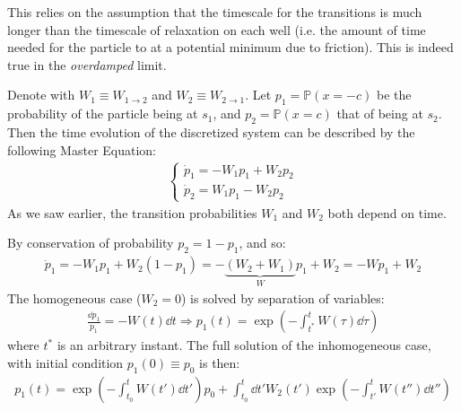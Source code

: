 \documentclass[../template.tex]{subfiles}
\begin{document}
\begin{expl}
    This relies on the assumption that the timescale for the transitions is much longer than the timescale of relaxation on each well (i.e. the amount of time needed for the particle to  at a potential minimum due to friction). This is indeed true in the \textit{overdamped} limit. 
\end{expl}

Denote with $W_1 \equiv W_{1 \to 2}$ and $W_2 \equiv W_{2 \to 1}$. Let $p_1 = \mathbb{P}(x=-c)$ be the probability of the particle being at $s_1$, and $p_2 = \mathbb{P}(x=c)$ that of being at $s_2$. Then the time evolution of the discretized system can be described by the following Master Equation:
\begin{align*}
    \begin{cases}
        \dot{p}_1 = -W_1p_1 + W_2 p_2\\
        \dot{p}_2 = W_1 p_1 - W_2 p_2
    \end{cases}
\end{align*}
As we saw earlier, the transition probabilities $W_1$ and $W_2$ both depend on time.

By conservation of probability $p_2 = 1-p_1$, and so:
\begin{align} \label{eqn:p1diff}
    \dot{p}_1 = - W_1 p_1 + W_2(1-p_1) = -\underbrace{(W_2+W_1)}_{W} p_1 + W_2 = - W p_1 + W_2
\end{align}
The homogeneous case ($W_2=0$) is solved by separation of variables:
\begin{align*}
    \frac{\dd{p_1}}{p_1} = -W(t) \dd{t} \Rightarrow p_1(t) = \exp\left(-\int_{t^*}^t W(\tau) \dd{\tau}\right) 
\end{align*}
where $t^*$ is an arbitrary instant. The full solution of the inhomogeneous case, with initial condition $p_1(0) \equiv p_0$ is then:
\begin{align} \label{eqn:solp1}
    p_1(t) = \exp\left(-\int_{t_0}^t W(t') \dd{t'}\right) p_0 + \int_{t_0}^t \dd{t'} W_2(t') \exp\left(-\int_{t'}^t W(t'')\dd{t''}\right)
\end{align}
\end{document}
